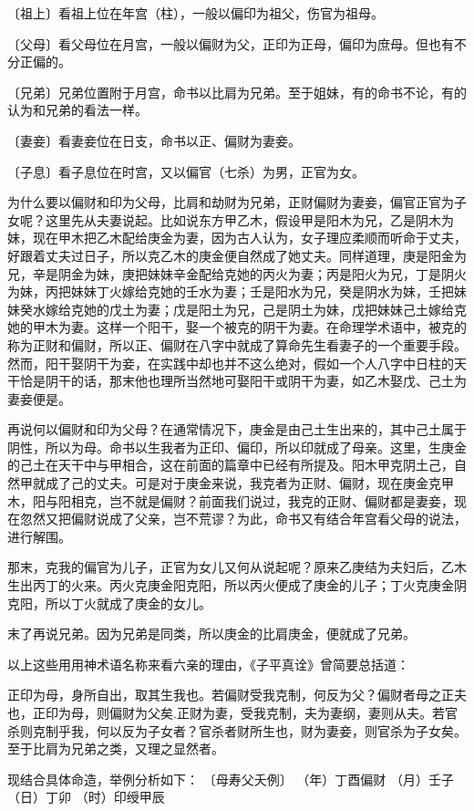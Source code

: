 \documentclass[a5paper,oneside,12pt]{ctexbook}
\newenvironment{yinyong}{%
    \begin{list}{}{\parsep\parskip
        \setlength\topsep{0pt}
        \setlength\itemindent{2em}%
        \setlength\parindent{2em}
        \setlength\listparindent{2em}
        \setlength{\leftmargin}{2em}
        \setlength{\rightmargin}{2em}
        \kaishu
    }
    \item[]
}{
  \end{list}
}
\begin{document}
〔祖上〕看祖上位在年宫（柱），一般以偏印为祖父，伤官为祖母。\par
〔父母〕看父母位在月宫，一般以偏财为父，正印为正母，偏印为庶母。但也有不分正偏的。\par
〔兄弟〕兄弟位置附于月宫，命书以比肩为兄弟。至于姐妹，有的命书不论，有的认为和兄弟的看法一样。\par
〔妻妾〕看妻妾位在日支，命书以正、偏财为妻妾。\par
〔子息〕看子息位在时宫，又以偏官（七杀）为男，正官为女。

为什么要以偏财和印为父母，比肩和劫财为兄弟，正财偏财为妻妾，偏官正官为子女呢？这里先从夫妻说起。比如说东方甲乙木，假设甲是阳木为兄，乙是阴木为妹，现在甲木把乙木配给庚金为妻，因为古人认为，女子理应柔顺而听命于丈夫，好跟着丈夫过日子，所以克乙木的庚金便自然成了她丈夫。同样道理，庚是阳金为兄，辛是阴金为妹，庚把妹妹辛金配给克她的丙火为妻；丙是阳火为兄，丁是阴火为妹，丙把妹妹丁火嫁给克她的壬水为妻；壬是阳水为兄，癸是阴水为妹，壬把妹妹癸水嫁给克她的戊土为妻；戊是阳土为兄，己是阴土为妹，戊把妹妹己土嫁给克她的甲木为妻。这样一个阳干，娶一个被克的阴干为妻。在命理学术语中，被克的称为正财和偏财，所以正、偏财在八字中就成了算命先生看妻子的一个重要手段。然而，阳干娶阴干为妾，在实践中却也并不这么绝对，假如一个人八字中日柱的天干恰是阴干的话，那末他也理所当然地可娶阳干或阴干为妻，如乙木娶戊、己土为妻妾便是。

再说何以偏财和印为父母？在通常情况下，庚金是由己土生出来的，其中己土属于阴性，所以为母。命书以生我者为正印、偏印，所以印就成了母亲。这里，生庚金的己土在天干中与甲相合，这在前面的篇章中已经有所提及。阳木甲克阴土己，自然甲就成了己的丈夫。可是对于庚金来说，我克者为正财、偏财，现在庚金克甲木，阳与阳相克，岂不就是偏财？前面我们说过，我克的正财、偏财都是妻妾，现在忽然又把偏财说成了父亲，岂不荒谬？为此，命书又有结合年宫看父母的说法，进行解围。

那末，克我的偏官为儿子，正官为女儿又何从说起呢？原来乙庚结为夫妇后，乙木生出丙丁的火来。丙火克庚金阳克阳，所以丙火便成了庚金的儿子；丁火克庚金阴克阳，所以丁火就成了庚金的女儿。

末了再说兄弟。因为兄弟是同类，所以庚金的比肩庚金，便就成了兄弟。

以上这些用用神术语名称来看六亲的理由，《子平真诠》曾简要总括道：
\begin{yinyong}
正印为母，身所自出，取其生我也。若偏财受我克制，何反为父？偏财者母之正夫也，正印为母，则偏财为父矣.正财为妻，受我克制，夫为妻纲，妻则从夫。若官杀则克制乎我，何以反为子女者？官杀者财所生也，财为妻妾，则官杀为子女矣。至于比肩为兄弟之类，又理之显然者。   
\end{yinyong}
现结合具体命造，举例分析如下：
〔母寿父夭例〕
（年）丁酉偏财
（月）壬子
（日）丁卯
（时）印绶甲辰
\end{document}
